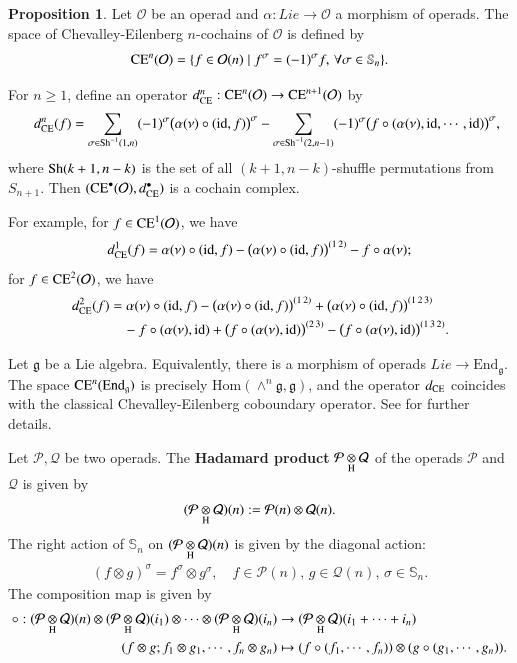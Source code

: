 \documentclass[12pt]{amsart}
\theoremstyle{definition}
\newtheorem{pro}[thm]{Proposition}
\newcommand{\g}{\mathfrak g}
\newcommand{\huaO}{{\mathcal{O}}}
\newcommand{\id}{\mathrm{id}}
\newcommand{\Hom}{\mathrm{Hom}}
\newcommand{\End}{\mathrm{End}}
\newcommand{\ot}{\otimes}
\newcommand{\s}{\mathbb{S}}
\newcommand{\ceo}{{\rm CE}^{\bullet}}
\newcommand{\Sh}{{\rm Sh}}
\newcommand{\ce}{{\rm CE}}
\begin{document}
\begin{pro}\cite{BKV,Bala1995}\label{CEO-cochain}
	Let $\huaO$ be an operad and $\alpha:Lie\to\huaO$ a morphism of operads.
	The space of Chevalley-Eilenberg $n$-cochains of $\mathcal{O}$ is defined by
	\begin{align}\label{def-ce}
		\ce^n(\mathcal{O})=\{f\in \mathcal{O}(n)\mid f^\sigma=(-1)^\sigma f,\,\forall\sigma\in \mathbb{S}_n\}.
	\end{align}

For $n\geq 1$, define an operator $d_{\ce}^n:\ce^n(\mathcal{O})\to \ce^{n+1}(\mathcal{O})$ by
	\begin{eqnarray}\label{dce}
		&&d^n_{\rm CE}(f)=\underset{\sigma\in\Sh^{-1}(1,n)}{\sum}(-1)^{\sigma}\big(\alpha(\nu)\circ (\id,f)\big)^{\sigma}-\underset{\sigma\in\Sh^{-1}(2,n-1)}{\sum}(-1)^{\sigma}\big(f\circ(\alpha(\nu),\id,\cdots,\id)\big)^{\sigma},
	\end{eqnarray}
where $\Sh(k+1,n-k)$ is the set of all $(k+1,n-k)$-shuffle permutations from $S_{n+1}$.
	Then $(\ceo(\huaO),d^\bullet_{\ce})$ is a cochain complex.
\end{pro}
For example,  for $f\in \ce^1(\mathcal{O})$, we have
$$
d^1_\ce(f)=\alpha(\nu)\circ(\id,f)-\big(\alpha(\nu)\circ (\id,f)\big)^{(1\,2)}-f\circ \alpha(\nu);
$$
for $f\in \ce^2(\mathcal{O})$, we have
\begin{align*}
	d^2_\ce(f)&=\alpha(\nu)\circ(\id,f)-\big(\alpha(\nu)\circ (\id,f)\big)^{(1\,2)}+\big(\alpha(\nu)\circ (\id,f)\big)^{(1\,2\,3)}\\
	&\quad-f\circ(\alpha(\nu),\id)+\big(f\circ(\alpha(\nu),\id)\big)^{(2\,3)}-\big(f\circ(\alpha(\nu),\id)\big)^{(1\,3\,2)}.
\end{align*}




Let $\g$ be a Lie algebra. Equivalently, there is a morphism of operads $Lie\to\End_\g$. The space $\ce^n(\End_\g)$ is precisely $\Hom(\wedge^n\g,\g)$, and the operator $d_{\rm CE}$ coincides with the classical Chevalley-Eilenberg coboundary operator. See \cite{BKV} for further details.


Let $\mathcal{P},\mathcal{Q}$ be two operads. The \textbf{Hadamard product} $\mathcal{P}\underset{\rm H}{\ot}\mathcal{Q}$ of the operads $\mathcal{P}$ and $\mathcal{Q}$ is given by
$$
(\mathcal{P}\underset{\rm H}{\ot}\mathcal{Q})(n):=\mathcal{P}(n)\ot \mathcal{Q}(n).
$$
The right action of $\s_n$ on $(\mathcal{P}\underset{\rm H}{\ot}\mathcal{Q})(n)$ is given by the diagonal action:
\begin{eqnarray*}
	(f\ot g)^\sigma=f^\sigma\ot g^\sigma,\quad f\in \mathcal{P}(n),\,g\in\mathcal{Q}(n),\,\sigma\in\s_n.
\end{eqnarray*}
The composition map is given by
\begin{align*}
	\circ: (\mathcal{P}\underset{\rm H}{\ot}\mathcal{Q})(n) \otimes (\mathcal{P}\underset{\rm H}{\ot}\mathcal{Q})(i_1) \otimes \cdots \otimes (\mathcal{P}\underset{\rm H}{\ot}\mathcal{Q})(i_n) &\to (\mathcal{P}\underset{\rm H}{\ot}\mathcal{Q})(i_1 + \cdots + i_n)\\
	(f\ot g;f_1\ot g_1,\cdots,f_n\ot g_n)&\mapsto (f\circ(f_1,\cdots,f_n))\ot (g\circ(g_1, \cdots, g_n)).
\end{align*}
\end{document}
